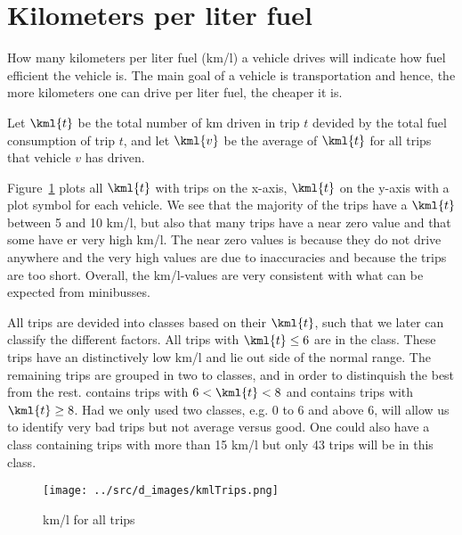 \section{Kilometers per liter fuel}

How many kilometers per liter fuel (km/l) a vehicle drives will indicate how fuel efficient the vehicle is.
The main goal of a vehicle is transportation and hence, the more kilometers one can drive per liter fuel, the cheaper it is.

Let $\kml{t}$ be the total number of km driven in trip $t$ devided by the total fuel consumption of trip $t$, and let $\kml{v}$ be the average of $\kml{t}$ for all trips that vehicle $v$ has driven.

Figure~\ref{fig:kmlTrips} plots all $\kml{t}$ with trips on the x-axis, $\kml{t}$ on the y-axis with a plot symbol for each vehicle.
We see that the majority of the trips have a $\kml{t}$ between 5 and 10 km/l, but also that many trips have a near zero value and that some have er very high km/l.
The near zero values is because they do not drive anywhere and the very high values are due to inaccuracies and because the trips are too short.
Overall, the km/l-values are very consistent with what can be expected from minibusses.

All trips are devided into classes based on their $\kml{t}$, such that we later can classify the different factors. %
All trips with $\kml{t}\leq6$ are in the \fuelLow class. These trips have an distinctively low km/l and lie out side of the normal range. 
The remaining trips are grouped in two to classes, \fuelMedium and \fuelHigh in order to distinquish the best from the rest.
\fuelMedium contains trips with $6 < \kml{t} < 8$ and \fuelHigh contains trips with $\kml{t}\geq8$.
Had we only used two classes, e.g. 0 to 6 and above 6, will allow us to identify very bad trips but not average versus good. 
One could also have a class containing trips with more than 15 km/l but only 43 trips will be in this class. %
\begin{figure}[htb]
\centering
\texttt{[image: ../src/d\_images/kmlTrips.png]}
\caption{km/l for all trips}
\label{fig:kmlTrips}
\end{figure}

